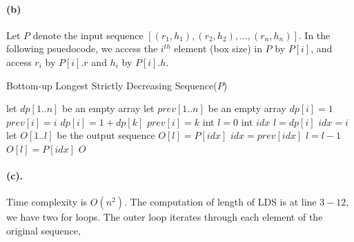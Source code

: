 \documentclass[12pt]{article}
\begin{document}
\paragraph{(b)} Let \(P\) denote the input sequence \([(r_1,h_1), (r_2,h_2), \hdots, (r_n,h_n)]\). In the following psuedocode, we access the \(i^{th}\) element (box size) in \(P\) by \(P[i]\), and access \(r_i\) by \(P[i].r\) and  \(h_i\) by \(P[i].h\).
\begin{algorithm}[H]
     \caption{Bottom-up Longest Strictly Decreasing Sequence(\(P\))}
     \begin{algorithmic}[1]
     \State let \(dp[1..n]\) be an empty array 
     \State let \(prev[1..n]\) be an empty array 
          \State \(dp[i] = 1\)
          \State \(prev[i] = i\)
                    \State \(dp[i] = 1 + dp[k]\)
                    \State \(prev[i] = k\)
               \EndIf
          \EndFor
     \EndFor
     \State int \(l = 0\)
     \State int \(idx\) 
               \State \(l = dp[i]\) 
               \State \(idx = i\) 
          \EndIf
     \EndFor
     \State let \(O[1..l]\) be the output sequence
          \State \(O[l] = P[idx]\)
          \State \(idx = prev[idx]\)
          \State \(l = l - 1\)
     \EndWhile
     \State \(O[l] = P[idx]\)
     \State \Return \(O\)
     \end{algorithmic}
\end{algorithm}

\paragraph{(c).} Time complexity is \(O(n^2)\). The computation of length of LDS is at line \(3-12\), we have two for loops. The outer loop iterates through each element of the original sequence,
\end{document}

